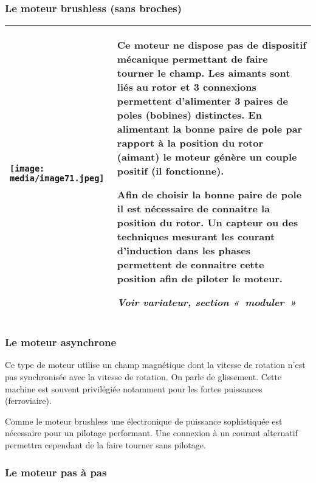 \documentclass[
]{article}
\begin{document}
\hypertarget{le-moteur-brushless-sans-broches}{%
\subsubsection{Le moteur brushless (sans
broches)}\label{le-moteur-brushless-sans-broches}}

\begin{longtable}[]{@{}
  >{\raggedright\arraybackslash}p{}
  >{\raggedright\arraybackslash}p{}@{}}
\toprule
\endhead
\texttt{[image: media/image71.jpeg]} &
Ce moteur ne dispose pas de dispositif mécanique permettant de faire
tourner le champ. Les aimants sont liés au rotor et 3 connexions
permettent d'alimenter 3 paires de poles (bobines) distinctes. En
alimentant la bonne paire de pole par rapport à la position du rotor
(aimant) le moteur génère un couple positif (il fonctionne).

Afin de choisir la bonne paire de pole il est nécessaire de connaitre la
position du rotor. Un capteur ou des techniques mesurant les courant
d'induction dans les phases permettent de connaitre cette position afin
de piloter le moteur.

\emph{Voir variateur, section «~moduler~»} \\
\bottomrule
\end{longtable}

\hypertarget{le-moteur-asynchrone}{%
\subsubsection{Le moteur asynchrone}\label{le-moteur-asynchrone}}

Ce type de moteur utilise un champ magnétique dont la vitesse de
rotation n'est pas synchronisée avec la vitesse de rotation. On parle de
glissement. Cette machine est souvent privilégiée notamment pour les
fortes puissances (ferroviaire).

Comme le moteur brushless une électronique de puissance sophistiquée est
nécessaire pour un pilotage performant. Une connexion à un courant
alternatif permettra cependant de la faire tourner sans pilotage.

\hypertarget{le-moteur-pas-uxe0-pas}{%
\subsubsection{Le moteur pas à pas}\label{le-moteur-pas-uxe0-pas}}
\end{document}
